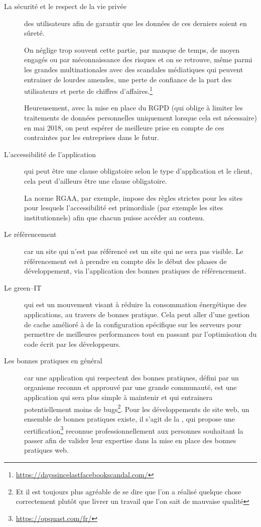 \begin{description}
	\item [La sécurité et le respect de la vie privée] des utilisateurs afin de garantir que les données de ces derniers soient en sûreté. 
	
	On néglige trop souvent cette partie, par manque de temps, de moyen engagés ou par méconnaissance des risques et on se retrouve, même parmi les grandes multinationales avec des scandales médiatiques qui peuvent entrainer de lourdes amendes, une perte de confiance de la part des utilisateurs et perte de chiffres d'affaires.\footnote{\url{https://dayssincelastfacebookscandal.com/}}
	
	Heureusement, avec la mise en place du \gls{RGPD} (qui oblige à limiter les traitements de données personnelles uniquement lorsque cela est nécessaire) en mai 2018, on peut espérer de meilleure prise en compte de ces contraintes par les entreprises dans le futur.
	\item [L'accessibilité de l'application] qui peut être une clause obligatoire selon le type d'application et le client, cela peut d'ailleurs être une clause obligatoire.
	
	La norme \gls{RGAA}, par exemple, impose des règles strictes pour les sites pour lesquels l'accessibilité est primordiale (par exemple les sites institutionnels) afin que chacun puisse accéder au contenu.
	\item [Le référencement] car un site qui n'est pas référencé est un site qui ne sera pas visible. Le référencement est à prendre en compte dès le début des phases de développement, via l'application des bonnes pratiques de référencement.
	\item [Le green--IT] qui est un mouvement visant à réduire la consommation énergétique des applications, au travers de bonnes pratique. Cela peut aller d'une gestion de cache amélioré à de la configuration spécifique sur les serveurs pour permettre de meilleures performances tout en passant par l'optimisation du code écrit par les développeurs.
	\item [Les bonnes pratiques en général] car une application qui respectent des bonnes pratiques, défini par un organisme reconnu et approuvé par une grande communauté, est une application qui sera plus simple à maintenir et qui entrainera potentiellement moins de bugs\footnote{Et il est toujours plus agréable de se dire que l'on a réalisé quelque chose correctement plutôt que livrer un travail que l'on sait de mauvaise qualité}. Pour les développements de site web, un ensemble de bonnes pratiques existe, il s'agit de la  \cite{opquast-best-practices}, qui propose une certification\footnote{\url{https://opquast.com/fr/}} reconnue professionnellement aux personnes souhaitant la passer afin de valider leur expertise dans la mise en place des bonnes pratiques web.
\end{description}

